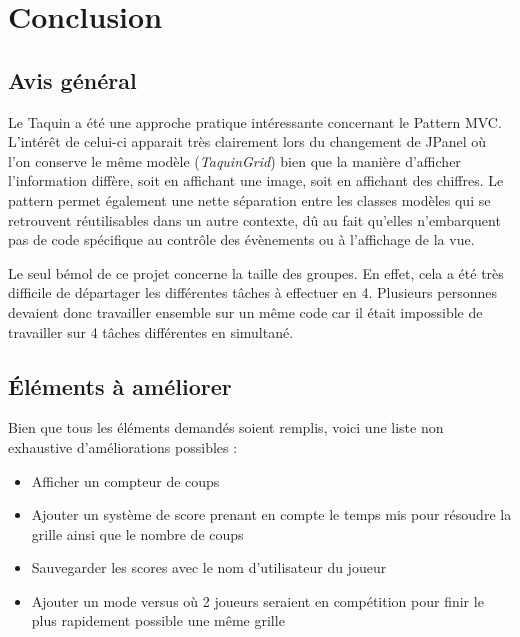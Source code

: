 \chapter{Conclusion}

	\section{Avis général}

		Le Taquin a été une approche pratique intéressante concernant le Pattern MVC. L'intérêt de celui-ci apparait très clairement lors du changement de JPanel où l'on conserve le même modèle (\textit{TaquinGrid}) bien que la manière d'afficher l'information diffère, soit en affichant une image, soit en affichant des chiffres. Le pattern permet également une nette séparation entre les classes modèles qui se retrouvent réutilisables dans un autre contexte, dû au fait qu'elles n'embarquent pas de code spécifique au contrôle des évènements ou à l'affichage de la vue.

		Le seul bémol de ce projet concerne la taille des groupes. En effet, cela a été très difficile de départager les différentes tâches à effectuer en 4. Plusieurs personnes devaient donc travailler ensemble sur un même code car il était impossible de travailler sur 4 tâches différentes en simultané.

	\section{Éléments à améliorer}

		Bien que tous les éléments demandés soient remplis, voici une liste non exhaustive d'améliorations possibles :

		\begin{itemize}
			\item{Afficher un compteur de coups}
			\item{Ajouter un système de score prenant en compte le temps mis pour résoudre la grille ainsi que le nombre de coups}
			\item{Sauvegarder les scores avec le nom d'utilisateur du joueur}
			\item{Ajouter un mode versus où 2 joueurs seraient en compétition pour finir le plus rapidement possible une même grille}
		\end{itemize}
